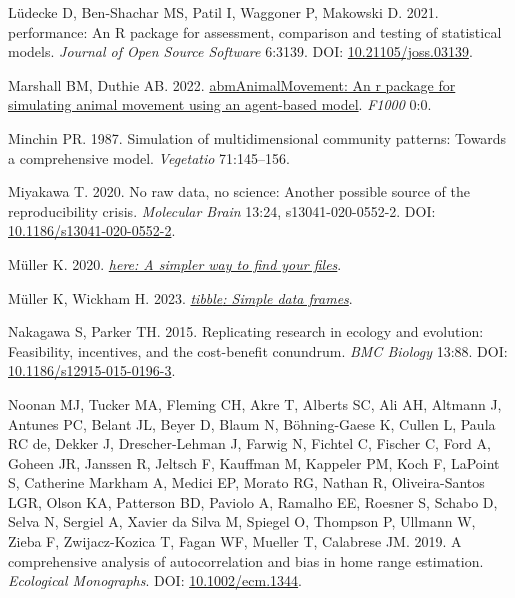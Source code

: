 \documentclass[10pt,a4paper]{article}
\newlength{\cslhangindent}
\newlength{\cslentryspacingunit} %
\newenvironment{CSLReferences}[2] %
 {%
  \setlength{\parindent}{0pt}
  \ifodd #1
  \let\oldpar\par
  \def\par{\hangindent=\cslhangindent\oldpar}
  \fi
  \setlength{\parskip}{#2\cslentryspacingunit}
 }%
 {}
\begin{document}
\begin{CSLReferences}{1}{0}
\leavevmode{}%
Lüdecke D, Ben-Shachar MS, Patil I, Waggoner P, Makowski D. 2021. {performance}: An {R} package for assessment, comparison and testing of statistical models. \emph{Journal of Open Source Software} 6:3139. DOI: \href{https://doi.org/10.21105/joss.03139}{10.21105/joss.03139}.

\leavevmode{}%
Marshall BM, Duthie AB. 2022. \href{https://0}{{abmAnimalMovement}: An r package for simulating animal movement using an agent-based model}. \emph{F1000} 0:0.

\leavevmode{}%
Minchin PR. 1987. Simulation of multidimensional community patterns: Towards a comprehensive model. \emph{Vegetatio} 71:145--156.

\leavevmode{}%
Miyakawa T. 2020. No raw data, no science: Another possible source of the reproducibility crisis. \emph{Molecular Brain} 13:24, s13041-020-0552-2. DOI: \href{https://doi.org/10.1186/s13041-020-0552-2}{10.1186/s13041-020-0552-2}.

\leavevmode{}%
Müller K. 2020. \emph{\href{https://CRAN.R-project.org/package=here}{{here}: A simpler way to find your files}}.

\leavevmode{}%
Müller K, Wickham H. 2023. \emph{\href{https://CRAN.R-project.org/package=tibble}{{tibble}: Simple data frames}}.

\leavevmode{}%
Nakagawa S, Parker TH. 2015. Replicating research in ecology and evolution: Feasibility, incentives, and the cost-benefit conundrum. \emph{BMC Biology} 13:88. DOI: \href{https://doi.org/10.1186/s12915-015-0196-3}{10.1186/s12915-015-0196-3}.

\leavevmode{}%
Noonan MJ, Tucker MA, Fleming CH, Akre T, Alberts SC, Ali AH, Altmann J, Antunes PC, Belant JL, Beyer D, Blaum N, Böhning-Gaese K, Cullen L, Paula RC de, Dekker J, Drescher-Lehman J, Farwig N, Fichtel C, Fischer C, Ford A, Goheen JR, Janssen R, Jeltsch F, Kauffman M, Kappeler PM, Koch F, LaPoint S, Catherine Markham A, Medici EP, Morato RG, Nathan R, Oliveira-Santos LGR, Olson KA, Patterson BD, Paviolo A, Ramalho EE, Roesner S, Schabo D, Selva N, Sergiel A, Xavier da Silva M, Spiegel O, Thompson P, Ullmann W, Zieba F, Zwijacz-Kozica T, Fagan WF, Mueller T, Calabrese JM. 2019. A comprehensive analysis of autocorrelation and bias in home range estimation. \emph{Ecological Monographs}. DOI: \href{https://doi.org/10.1002/ecm.1344}{10.1002/ecm.1344}.


\end{CSLReferences}
\end{document}
